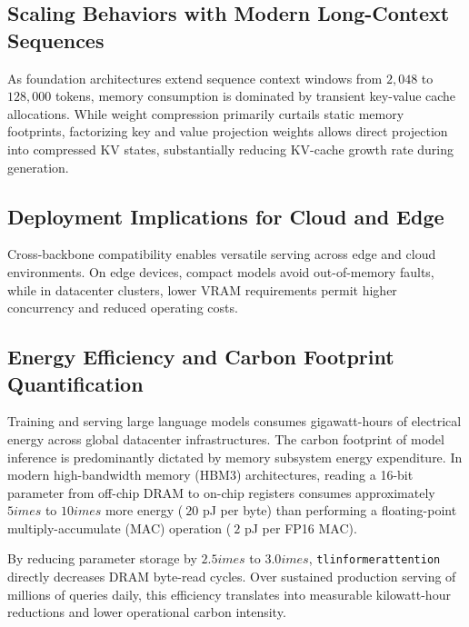 \subsection{Scaling Behaviors with Modern Long-Context Sequences}
As foundation architectures extend sequence context windows from $2{,}048$ to $128{,}000$ tokens, memory consumption is dominated by transient key-value cache allocations. While weight compression primarily curtails static memory footprints, factorizing key and value projection weights allows direct projection into compressed KV states, substantially reducing KV-cache growth rate during generation.

\subsection{Deployment Implications for Cloud and Edge}
Cross-backbone compatibility enables versatile serving across edge and cloud environments. On edge devices, compact models avoid out-of-memory faults, while in datacenter clusters, lower VRAM requirements permit higher concurrency and reduced operating costs.

\subsection{Energy Efficiency and Carbon Footprint Quantification}
Training and serving large language models consumes gigawatt-hours of electrical energy across global datacenter infrastructures. The carbon footprint of model inference is predominantly dictated by memory subsystem energy expenditure. In modern high-bandwidth memory (HBM3) architectures, reading a 16-bit parameter from off-chip DRAM to on-chip registers consumes approximately $5	imes$ to $10	imes$ more energy ($~20$ pJ per byte) than performing a floating-point multiply-accumulate (MAC) operation ($~2$ pJ per FP16 MAC).

By reducing parameter storage by $2.5	imes$ to $3.0	imes$, \texttt{tlinformerattention} directly decreases DRAM byte-read cycles. Over sustained production serving of millions of queries daily, this efficiency translates into measurable kilowatt-hour reductions and lower operational carbon intensity.
